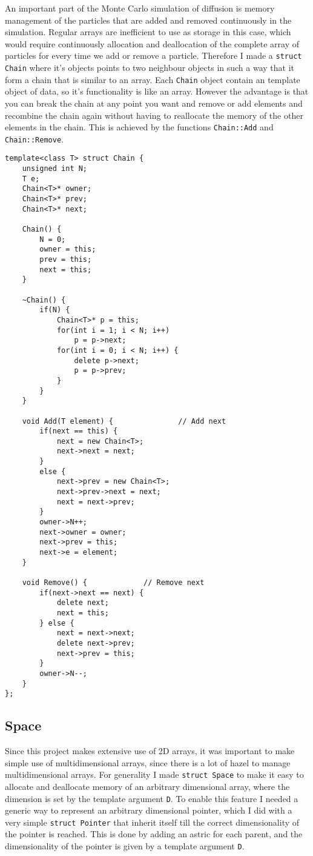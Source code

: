 \documentclass[11pt,english,a4paper]{article}
\begin{document}
\begin{flushleft}
An important part of the Monte Carlo simulation of diffusion is memory management of the particles that are added and removed continuously in the simulation. Regular arrays are inefficient to use as storage in this case, which would require continuously allocation and deallocation of the complete array of particles for every time we add or remove a particle. Therefore I made a \texttt{struct Chain} where it's objects points to two neighbour objects in such a way that it form a chain that is similar to an array. Each \texttt{Chain} object contain an template object of data, so it's functionality is like an array. However the advantage is that you can break the chain at any point you want and remove or add elements and recombine the chain again without having to reallocate the memory of the other elements in the chain. This is achieved by the functions \texttt{Chain::Add} and \texttt{Chain::Remove}.

\begin{lstlisting}[title={\texttt{template<class T> struct Chain}}]
template<class T> struct Chain {
	unsigned int N;
	T e;
	Chain<T>* owner;
	Chain<T>* prev;
	Chain<T>* next;
	
	Chain() {
		N = 0;
		owner = this;
		prev = this;
		next = this;
	}
	
	~Chain() {
		if(N) {
			Chain<T>* p = this;
			for(int i = 1; i < N; i++)
				p = p->next;
			for(int i = 0; i < N; i++) {
				delete p->next;
				p = p->prev;
			}
		}
	}
	
	void Add(T element) {				// Add next
		if(next == this) {
			next = new Chain<T>;
			next->next = next;
		}
		else {
			next->prev = new Chain<T>;
			next->prev->next = next;
			next = next->prev;
		}
		owner->N++;
		next->owner = owner;
		next->prev = this;
		next->e = element;
	}
	
	void Remove() {             // Remove next
		if(next->next == next) {
			delete next;
			next = this;
		} else {
			next = next->next;
			delete next->prev;
			next->prev = this;
		}
		owner->N--;
	}
};
\end{lstlisting}

\subsection{Space}

Since this project makes extensive use of 2D arrays, it was important to make simple use of multidimensional arrays, since there is a lot of hazel to manage multidimensional arrays. For generality I made \texttt{struct Space} to make it easy to allocate and deallocate memory of an arbitrary dimensional array, where the dimension is set by the template argument \texttt{D}. To enable this feature I needed a generic way to represent an arbitrary dimensional pointer, which I did with a very simple \texttt{struct Pointer} that inherit itself till the correct dimensionality of the pointer is reached. This is done by adding an astric for each parent, and the dimensionality of the pointer is given by a template argument \texttt{D}.


\end{flushleft}
\end{document}
